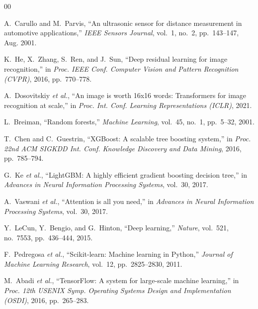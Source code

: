 \documentclass[conference,a4paper]{IEEEtran}
\begin{document}
\begin{thebibliography}{00}

A.~Carullo and M.~Parvis, ``An ultrasonic sensor for distance measurement in automotive applications,'' \textit{IEEE Sensors Journal}, vol.~1, no.~2, pp.~143--147, Aug. 2001.

K.~He, X.~Zhang, S.~Ren, and J.~Sun, ``Deep residual learning for image recognition,'' in \textit{Proc. IEEE Conf. Computer Vision and Pattern Recognition (CVPR)}, 2016, pp.~770--778.

A.~Dosovitskiy \textit{et al.}, ``An image is worth 16x16 words: Transformers for image recognition at scale,'' in \textit{Proc. Int. Conf. Learning Representations (ICLR)}, 2021.

L.~Breiman, ``Random forests,'' \textit{Machine Learning}, vol.~45, no.~1, pp.~5--32, 2001.

T.~Chen and C.~Guestrin, ``XGBoost: A scalable tree boosting system,'' in \textit{Proc. 22nd ACM SIGKDD Int. Conf. Knowledge Discovery and Data Mining}, 2016, pp.~785--794.

G.~Ke \textit{et al.}, ``LightGBM: A highly efficient gradient boosting decision tree,'' in \textit{Advances in Neural Information Processing Systems}, vol.~30, 2017.

A.~Vaswani \textit{et al.}, ``Attention is all you need,'' in \textit{Advances in Neural Information Processing Systems}, vol.~30, 2017.

Y.~LeCun, Y.~Bengio, and G.~Hinton, ``Deep learning,'' \textit{Nature}, vol.~521, no.~7553, pp.~436--444, 2015.

F.~Pedregosa \textit{et al.}, ``Scikit-learn: Machine learning in Python,'' \textit{Journal of Machine Learning Research}, vol.~12, pp.~2825--2830, 2011.

M.~Abadi \textit{et al.}, ``TensorFlow: A system for large-scale machine learning,'' in \textit{Proc. 12th USENIX Symp. Operating Systems Design and Implementation (OSDI)}, 2016, pp.~265--283.

\end{thebibliography}
\end{document}
